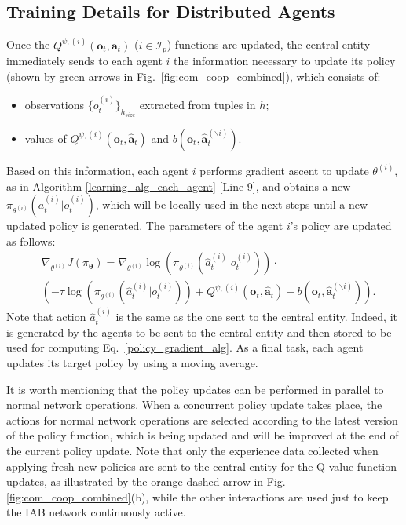 \vspace{-10pt}
\subsection{Training Details for Distributed Agents}
Once the $Q^{\psi,(i)}(\mathbf{o}_t,\mathbf{a}_t)$ ($i\in\mathcal{I}_p$) functions are updated, the central entity immediately sends to each agent $i$ the information necessary to update its policy (shown by green arrows  in Fig.~\ref{fig:com_coop_combined}), which consists of:
\begin{itemize}
    \item observations $\{o^{(i)}_t\}_{h_{size}}$ extracted from tuples in $h$;
    \item values of $Q^{\psi,(i)}(\mathbf{o}_t,\mathbf{\hat{a}}_t)$ and $b(\mathbf{o}_t,\mathbf{\hat{a}}^{(\backslash i)}_t)$.
\end{itemize}
Based on this information, each agent $i$ performs gradient ascent to update $\theta^{(i)}$, as in Algorithm \ref{learning_alg_each_agent} [Line 9], and obtains a new $\pi_{\theta^{(i)}}(a^{(i)}_t|o^{(i)}_t)$, which will be locally used in the next steps until a new updated policy is generated.
The parameters of the agent $i$'s policy are updated as follows:
\begin{align}
    &\nabla_{\theta^{(i)}}J(\pi_{\boldsymbol{\uptheta}}) = \nabla_{\theta^{(i)}} \log( \pi_{\theta^{(i)}}(\hat{a}^{(i)}_t|o^{(i)}_t) )\cdot\nonumber\\
    &\left(-\tau\log( \pi_{\theta^{(i)}}(\hat{a}^{(i)}_t|o^{(i)}_t) )+
    Q^{\psi,(i)}(\mathbf{o}_t,\mathbf{\hat{a}}_t) - b(\mathbf{o}_t,\mathbf{\hat{a}}^{(\backslash i)}_t)\right).
    \label{policy_gradient_alg}
\end{align}
Note that action $\hat{a}^{(i)}_t$ is the same as the one sent to the central entity. Indeed, it is generated by the agents to be sent to the central entity and then stored to be used for computing Eq.~\ref{policy_gradient_alg}. As a final task, each agent updates its target policy by using a moving average.

It is worth mentioning that the policy updates can be performed in parallel to normal network operations. When a concurrent policy update takes place, the actions for normal network operations are selected according to the latest version of the policy function, which is being updated and will be improved at the end of the current policy update.
Note that only the experience data collected when applying fresh new policies are sent to the central entity for the Q-value function updates, as illustrated by the orange dashed arrow in Fig. \ref{fig:com_coop_combined}(b), while the other interactions are used just to keep the IAB network continuously active.
